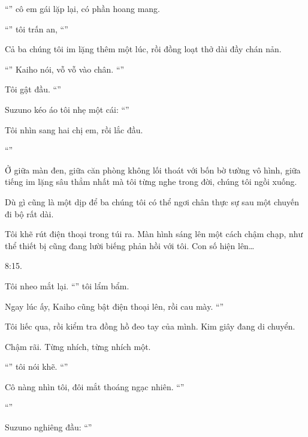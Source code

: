 \documentclass[../main.tex]{subfiles}
\begin{document}
``'' cô em gái lặp lại, có phần hoang mang.

``'' tôi trấn an, ``''

Cả ba chúng tôi im lặng thêm một lúc, rồi đồng loạt thở dài đầy chán nản.

``'' Kaiho nói, vỗ vỗ vào chân. ``''

Tôi gật đầu. ``''

Suzuno kéo áo tôi nhẹ một cái: ``''

Tôi nhìn sang hai chị em, rồi lắc đầu.

``''

Ở giữa màn đen, giữa căn phòng không lối thoát với bốn bờ tường vô hình, giữa tiếng im lặng sâu thẳm nhất mà tôi từng nghe trong đời, chúng tôi ngồi xuống.

Dù gì cũng là một dịp để ba chúng tôi có thể ngơi chân thực sự sau một chuyến đi bộ rất dài.

Tôi khẽ rút điện thoại trong túi ra. Màn hình sáng lên một cách chậm chạp, như thể thiết bị cũng đang lười biếng phản hồi với tôi. Con số hiện lên\dots

8:15.

Tôi nheo mắt lại. ``'' tôi lẩm bẩm.

Ngay lúc ấy, Kaiho cũng bật điện thoại lên, rồi cau mày. ``''

Tôi liếc qua, rồi kiểm tra đồng hồ đeo tay của mình. Kim giây đang di chuyển.

Chậm rãi. Từng nhích, từng nhích một.

``'' tôi nói khẽ. ``''

Cô nàng nhìn tôi, đôi mắt thoáng ngạc nhiên. ``''

``''

Suzuno nghiêng đầu: ``''
\end{document}
